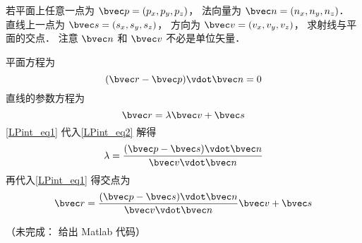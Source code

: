 

若平面上任意一点为 $\bvec p = (p_x, p_y, p_z)$， 法向量为 $\bvec n = (n_x, n_y, n_z)$． 直线上一点为 $\bvec s = (s_x, s_y, s_z)$， 方向为 $\bvec v = (v_x, v_y, v_z)$， 求射线与平面的交点． 注意 $\bvec n$ 和 $\bvec v$ 不必是单位矢量．

平面方程为
\begin{equation}\label{LPint_eq2}
(\bvec r - \bvec p) \vdot \bvec n = 0
\end{equation}
直线的参数方程为
\begin{equation}\label{LPint_eq1}
\bvec r = \lambda \bvec v + \bvec s
\end{equation}
\autoref{LPint_eq1} 代入\autoref{LPint_eq2} 解得
\begin{equation}
\lambda = \frac{(\bvec p - \bvec s)\vdot \bvec n}{\bvec v \vdot \bvec n}
\end{equation}
再代入\autoref{LPint_eq1} 得交点为
\begin{equation}\label{LPint_eq3}
\bvec r = \frac{(\bvec p - \bvec s)\vdot \bvec n}{\bvec v \vdot \bvec n} \bvec v + \bvec s
\end{equation}

（未完成： 给出 Matlab 代码）
